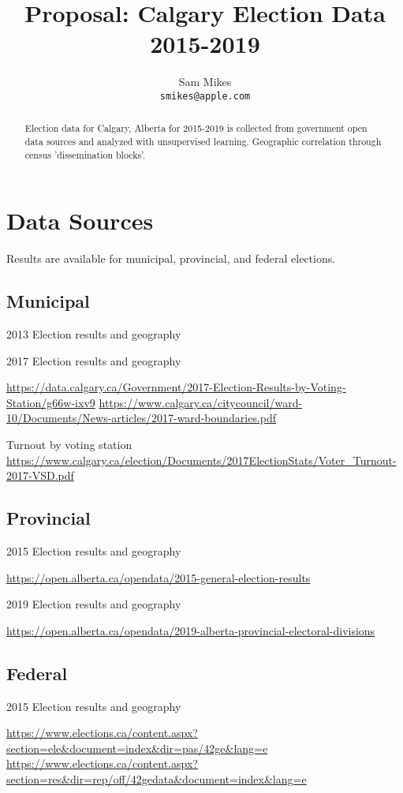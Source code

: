 \documentclass{article}
\title{Proposal: Calgary Election Data 2015-2019}
\author{%
  Sam Mikes \\
  \texttt{smikes@apple.com} \\
}
\begin{document}
\maketitle

\begin{abstract}
  Election data for Calgary, Alberta for 2015-2019 is collected
  from government open data sources and analyzed with unsupervised
  learning. Geographic correlation through census 'dissemination blocks'. 
\end{abstract}

\section{Data Sources}

Results are available for municipal, provincial, and federal elections.

\subsection{Municipal}

2013 Election results and geography


2017 Election results and geography

\url{https://data.calgary.ca/Government/2017-Election-Results-by-Voting-Station/g66w-ixv9}
\url{https://www.calgary.ca/citycouncil/ward-10/Documents/News-articles/2017-ward-boundaries.pdf}

Turnout by voting station
\url{https://www.calgary.ca/election/Documents/2017ElectionStats/Voter_Turnout-2017-VSD.pdf}

\subsection{Provincial}

2015 Election results and geography

\url{https://open.alberta.ca/opendata/2015-general-election-results}

2019 Election results and geography

\url{https://open.alberta.ca/opendata/2019-alberta-provincial-electoral-divisions}

\subsection{Federal}

2015 Election results and geography

\url{https://www.elections.ca/content.aspx?section=ele&document=index&dir=pas/42ge&lang=e}
\url{https://www.elections.ca/content.aspx?section=res&dir=rep/off/42gedata&document=index&lang=e}
\end{document}
